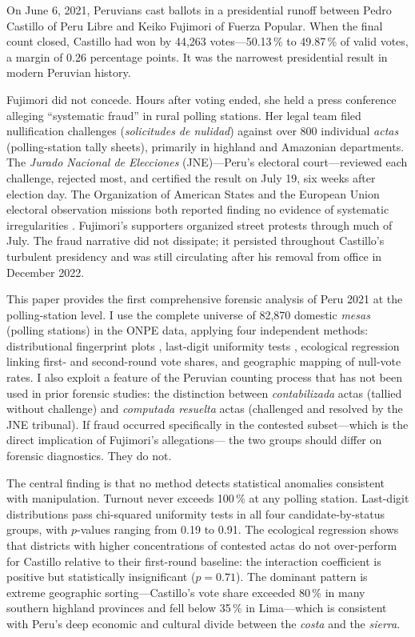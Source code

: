 \documentclass[12pt]{article}
\begin{document}
On June 6, 2021, Peruvians cast ballots in a presidential runoff between
Pedro Castillo of Peru Libre and Keiko Fujimori of Fuerza Popular. When the
final count closed, Castillo had won by 44,263 votes---50.13\,\% to 49.87\,\%
of valid votes, a margin of 0.26 percentage points. It was the narrowest
presidential result in modern Peruvian history.

Fujimori did not concede. Hours after voting ended, she held a press
conference alleging ``systematic fraud'' in rural polling stations. Her legal
team filed nullification challenges (\emph{solicitudes de nulidad}) against
over 800 individual \emph{actas} (polling-station tally sheets), primarily in
highland and Amazonian departments. The \emph{Jurado Nacional de Elecciones}
(JNE)---Peru's electoral court---reviewed each challenge, rejected most, and
certified the result on July 19, six weeks after election day. The
Organization of American States and the European Union electoral observation
missions both reported finding no evidence of systematic irregularities
\citep{oas2021, eu2021}. Fujimori's supporters organized street protests
through much of July. The fraud narrative did not dissipate; it persisted
throughout Castillo's turbulent presidency and was still circulating after his
removal from office in December 2022.

This paper provides the first comprehensive forensic analysis of Peru 2021
at the polling-station level. I use the complete universe of 82,870 domestic
\emph{mesas} (polling stations) in the ONPE data, applying four independent
methods: distributional fingerprint plots \citep{klimek2012}, last-digit
uniformity tests \citep{beber2012}, ecological regression linking first- and
second-round vote shares, and geographic mapping of null-vote rates. I also
exploit a feature of the Peruvian counting process that has not been used in
prior forensic studies: the distinction between \emph{contabilizada} actas
(tallied without challenge) and \emph{computada resuelta} actas (challenged
and resolved by the JNE tribunal). If fraud occurred specifically in the
contested subset---which is the direct implication of Fujimori's allegations---
the two groups should differ on forensic diagnostics. They do not.

The central finding is that no method detects statistical anomalies consistent
with manipulation. Turnout never exceeds 100\,\% at any polling station.
Last-digit distributions pass chi-squared uniformity tests in all four
candidate-by-status groups, with $p$-values ranging from 0.19 to 0.91.
The ecological regression shows that districts with higher concentrations of
contested actas do not over-perform for Castillo relative to their first-round
baseline: the interaction coefficient is positive but statistically
insignificant ($p = 0.71$). The dominant pattern is extreme geographic
sorting---Castillo's vote share exceeded 80\,\% in many southern highland
provinces and fell below 35\,\% in Lima---which is consistent with Peru's
deep economic and cultural divide between the \emph{costa} and the
\emph{sierra}.
\end{document}
